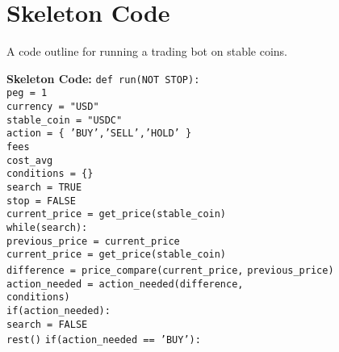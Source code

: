 \section{Skeleton Code}
\newcommand{\code}[1]{\colorbox{light-gray}{\texttt{#1}}}

A code outline for running a trading bot on stable coins. \par
\textbf{Skeleton Code:}
\newline
\code{def run(NOT STOP):}\\
\code{\indent \indent peg = 1}\\
\code{\indent \indent currency = "USD"} \\
\code{\indent  \indent stable\_coin = "USDC"} \\
\code{\indent \indent action = \{ 'BUY','SELL','HOLD' \} } \\
\code{\indent \indent fees} \\
\code{\indent \indent cost\_avg} \\
\code{\indent \indent conditions = \{\}} \\
\code{\indent \indent search = TRUE} \\
\code{\indent \indent stop = FALSE} \\
\code{\indent \indent current\_price = get\_price(stable\_coin)} \\
\newline
\code{\indent while(search):} \\
\code{\indent \indent \indent previous\_price = current\_price} \\
\code{\indent \indent \indent current\_price = get\_price(stable\_coin)} \\
\code{\indent \indent \indent difference = price\_compare(current\_price,}
\code{\indent \indent \indent \indent previous\_price)} \\
\code{\indent \indent \indent action\_needed = action\_needed(difference,} \\
\code{\indent \indent \indent \indent conditions)} \\ 
\code{\indent \indent \indent if(action\_needed):} \\
\code{\indent \indent \indent \indent search = FALSE} \\
\code{\indent \indent \indent rest()}
\newline
\code{\indent \indent if(action\_needed == 'BUY'):} \\
